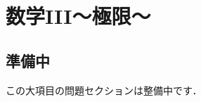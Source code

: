 \documentclass[../../ms_q.tex]{subfiles}
\begin{document}
\section{数学III～極限～}

\subsection*{準備中}
この大項目の問題セクションは整備中です．
\end{document}
